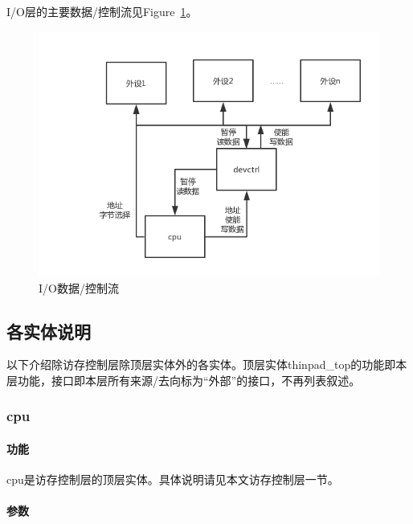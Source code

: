 \documentclass{article}
\begin{document}
\begin{spacing}{1.4}
I/O层的主要数据/控制流见Figure~\ref{fig:io-data-flow}。

\begin{figure}[!htb]
	\centering
	\includegraphics[width=.8\textwidth]{io-data-flow.png}
	\caption{I/O数据/控制流}
    \label{fig:io-data-flow}
\end{figure}

\subsection{各实体说明}

以下介绍除访存控制层除顶层实体外的各实体。顶层实体thinpad\_top的功能即本层功能，接口即本层所有来源/去向标为“外部”的接口，不再列表叙述。

\subsubsection{cpu}

\paragraph{功能}\mbox{}

cpu是访存控制层的顶层实体。具体说明请见本文访存控制层一节。

\paragraph{参数}\mbox{}


\end{spacing}
\end{document}
